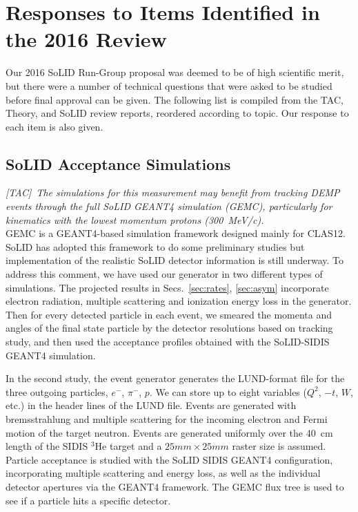 \section{Responses to Items Identified in the 2016 Review}

Our 2016 SoLID Run-Group proposal was deemed to be of high scientific merit,
but there were a number of technical questions that were asked to be studied
before final approval can be given.  The following list is compiled from the
TAC, Theory, and SoLID review reports, reordered according to topic.  Our 
response to each item is also given.

\subsection{SoLID Acceptance Simulations
\label{sec:resp_gemc}}

{\it [TAC]\ The simulations for this measurement may benefit from tracking
  DEMP events through the full SoLID GEANT4 simulation (GEMC), particularly for
  kinematics with the lowest momentum protons (300~MeV/c).}\\[0.2ex]

GEMC is a GEANT4-based simulation framework designed mainly for CLAS12. SoLID has adopted this framework to do some preliminary studies but implementation of the realistic SoLID detector information is still underway.  
To address this comment, we have
used our generator in two different types of simulations.  The projected
results in Secs.~\ref{sec:rates}, \ref{sec:asym} incorporate electron
radiation, multiple scattering and ionization energy loss in the generator.
Then for every detected particle in each event, we smeared the momenta and
angles of the final state particle by the detector resolutions based on tracking study, 
and then used the acceptance profiles
obtained with the SoLID-SIDIS GEANT4 simulation.

In the second study, the event generator generates the LUND-format file for
the three outgoing particles, $e^-$, $\pi^-$, $p$. 
We can store up to eight variables ($Q^2$, $-t$, $W$, etc.) in the header 
lines of the LUND file.  Events are generated with 
bremsstrahlung and multiple scattering for the incoming electron and
Fermi motion of the target neutron. 
Events are generated uniformly over the 40~cm length of
the SIDIS $^3$He target and a $25 mm \times 25 mm$ raster size is
assumed.  Particle acceptance is studied with the SoLID SIDIS 
GEANT4 configuration, incorporating multiple scattering and energy loss, as
well as the individual detector apertures via the GEANT4 framework.
The GEMC flux tree is used to see if a particle hits a specific detector. 

